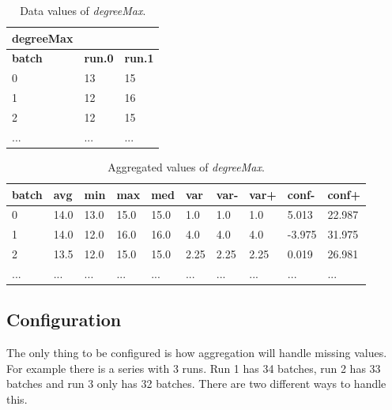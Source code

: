 \begin{table}[h]
\centering
\begin{tabular}[h]{|l|l|l|}\hline
	\textbf{degreeMax} & &\\
	\hline
	\textbf{batch} & \textbf{run.0} & \textbf{run.1}\\
	\hline
	0 & 13 & 15\\
	\hline
	1 & 12 & 16\\
	\hline
	2 & 12 & 15\\
	\hline
	... & ... & ... \\
	\hline
\end{tabular}
\caption{Data values of \textit{degreeMax}.}
\label{tab:degreemax-data}
\end{table}
\begin{table}[h]
\centering
\begin{tabular}[h]{|l|l|l|l|l|l|l|l|l|l|}\hline
	\textbf{batch} & \textbf{avg} & \textbf{min} & \textbf{max} & \textbf{med} & \textbf{var} & \textbf{var-} & \textbf{var+} & \textbf{conf-} & \textbf{conf+}\\
	\hline
	0 & 14.0 & 13.0 & 15.0 & 15.0 & 1.0 & 1.0 & 1.0 & 5.013 & 22.987\\
	\hline
	1 & 14.0 & 12.0 & 16.0 & 16.0 & 4.0 & 4.0 & 4.0 & -3.975 & 31.975\\
	\hline
	2 & 13.5 & 12.0 & 15.0 & 15.0 & 2.25 & 2.25 & 2.25 & 0.019 & 26.981\\
	\hline
	... & ... & ... & ... & ... & ... & ... & ... & ... & ...\\
	\hline
\end{tabular}
\caption{Aggregated values of \textit{degreeMax}.}
\label{tab:degreemax-aggr}
\end{table}

\subsection{Configuration}
The only thing to be configured is how aggregation will handle missing values. For example there is a series with 3 runs. Run 1 has 34 batches, run 2 has 33 batches and run 3 only has 32 batches. There are two different ways to handle this.

